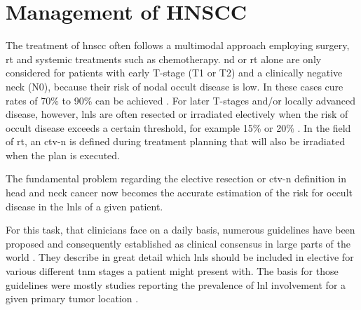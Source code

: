 \documentclass[\relativeRoot/main.tex]{subfiles}
\begin{document}
\section{Management of HNSCC}
\label{sec:intro:management}

The treatment of \gls{hnscc} often follows a multimodal approach employing surgery, \gls{rt} and systemic treatments such as chemotherapy. \Gls{nd} or \gls{rt} alone are only considered for patients with early T-stage (T1 or T2) and a clinically negative neck (N0), because their risk of nodal occult disease is low. In these cases cure rates of 70\% to 90\% can be achieved \cite{pfister_head_2014}. For later T-stages and/or locally advanced disease, however, \glspl{lnl} are often resected or irradiated electively when the risk of occult disease exceeds a certain threshold, for example 15\% or 20\% \cite{weiss_use_1997,pitman_rationale_2000,pillsbury_iii_rationale_1997}. In the field of \acrlong{rt}, an \gls{ctv-n} is defined during treatment planning that will also be irradiated when the plan is executed.

The fundamental problem regarding the elective resection or \gls{ctv-n} definition in head and neck cancer now becomes the accurate estimation of the risk for occult disease in the \glspl{lnl} of a given patient.

For this task, that clinicians face on a daily basis, numerous guidelines have been proposed and consequently established as clinical consensus in large parts of the world \cite{gregoire_ct-based_2003,gregoire_delineation_2014,gregoire_delineation_2018,gregoire_proposal_2006,gregoire_selection_2000,biau_selection_2019,eisbruch_intensity-modulated_2002,ferlito_elective_2009,vorwerk_guidelines_2011,chao_determination_2002}. They describe in great detail which \glspl{lnl} should be included in elective  for various different \gls{tnm} stages a patient might present with. The basis for those guidelines were mostly studies reporting the prevalence of \gls{lnl} involvement for a given primary tumor location \cite{candela_patterns_1990,shah_patterns_1990,woolgar_histological_1999,woolgar_topography_2007,chao_determination_2002,vauterin_patterns_2006,razfar_incidence_2009,ho_patterns_2012}.
\end{document}
